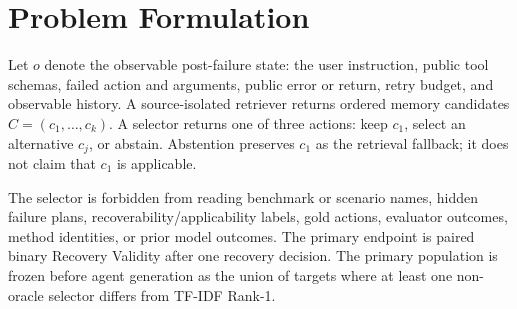 \section{Problem Formulation}

Let $o$ denote the observable post-failure state: the user instruction, public tool schemas, failed action and arguments, public error or return, retry budget, and observable history. A source-isolated retriever returns ordered memory candidates $C=(c_1,\ldots,c_k)$. A selector returns one of three actions: keep $c_1$, select an alternative $c_j$, or abstain. Abstention preserves $c_1$ as the retrieval fallback; it does not claim that $c_1$ is applicable.

The selector is forbidden from reading benchmark or scenario names, hidden failure plans, recoverability/applicability labels, gold actions, evaluator outcomes, method identities, or prior model outcomes. The primary endpoint is paired binary Recovery Validity after one recovery decision. The primary population is frozen before agent generation as the union of targets where at least one non-oracle selector differs from TF-IDF Rank-1.

